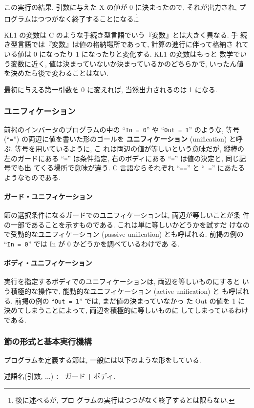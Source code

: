 \documentclass[a4,titlepage]{jsreport}
\def\em{\bf\dg}
\let\dg\bf
\newcommand{\commit}{\texttt{|}}
\begin{document}
この実行の結果, 引数に与えた X の値が 0 に決まったので, それが出力され, 
プログラムはつつがなく終了することになる.\footnote{後に述べるが, プロ
グラムの実行はつつがなく終了するとは限らない.}

KL1 の変数は C のような手続き型言語でいう『変数』とは大きく異なる.  手
続き型言語では『変数』は値の格納場所であって, 計算の進行に伴って格納さ
れている値は 0 になったり 1 になったりと変化する.  KL1 の変数はもっと
数学でいう変数に近く, 値は決まっていないか決まっているかのどちらかで, 
いったん値を決めたら後で変わることはない.

最初に与える第一引数を 0 に変えれば, 当然出力されるのは 1 になる.

\subsubsection{ユニフィケーション}
前掲のインバータのプログラムの中の ``{\tt In = 0}'' や ``{\tt Out =
1}'' のような, 等号 (``\verb|=|'') の両辺に値を書いた形のゴールを{\em 
ユニフィケーション} (unification) と呼ぶ.  等号を用いているように, こ
れは両辺の値が等しいという意味だが, 縦棒の左のガードにある ``{\tt =}'' 
は条件指定, 右のボディにある ``{\tt =}'' は値の決定と, 同じ記号でも出
てくる場所で意味が違う.  C 言語ならそれぞれ ``{\tt ==}'' と ``{\tt
=}'' にあたるようなものである.

\paragraph{ガード・ユニフィケーション}
節の選択条件になるガードでのユニフィケーションは, 両辺が等しいことが条
件の一部であることを示すものである.  これは単に等しいかどうかを試すだ
けなので受動的なユニフィケーション (passive unification) とも呼ばれる.
前掲の例の ``{\tt In = 0}'' では In が 0 かどうかを調べているわけであ
る.

\paragraph{ボディ・ユニフィケーション}
実行を指定するボディでのユニフィケーションは, 両辺を等しいものにすると
いう積極的な操作で, 能動的なユニフィケーション (active unification) と
も呼ばれる.  前掲の例の ``{\tt Out = 1}'' では, まだ値の決まっていなかっ
た Out の値を 1 に決めてしまうことによって, 両辺を積極的に等しいものに
してしまっているわけである.

\subsubsection{節の形式と基本実行機構}
プログラムを定義する節は, 一般には以下のような形をしている.
\begin{center}
述語名(引数, ...) {\tt :-} ガード {\commit} ボディ.
\end{center}
\end{document}
